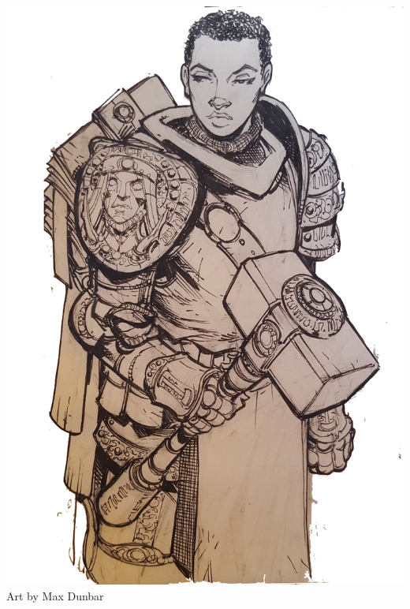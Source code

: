 \begin{multicols*}{2}
\begin{Figure}
\centering
\includegraphics[width=\textwidth]{img/paladin-2.png}
{\scriptsize Art by Max Dunbar}
\end{Figure}
    
\end{multicols*}

    